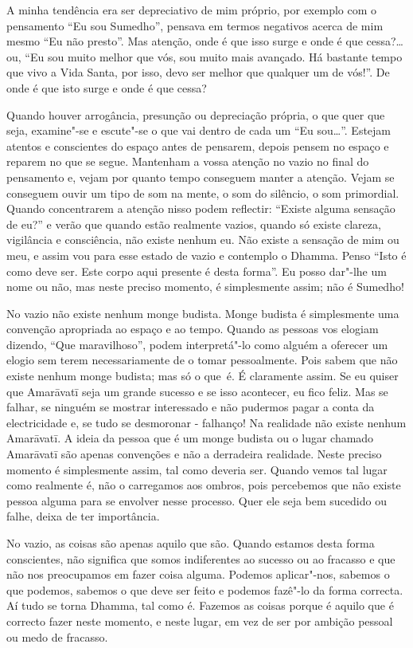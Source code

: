A minha tendência era ser depreciativo de mim próprio, por exemplo com o
pensamento “Eu sou Sumedho”, pensava em termos negativos acerca de mim mesmo “Eu
não presto”. Mas atenção, onde é que isso surge e onde é que cessa?\ldots{} ou,
“Eu sou muito melhor que vós, sou muito mais avançado. Há bastante tempo que
vivo a Vida Santa, por isso, devo ser melhor que qualquer um de vós!”. De onde é
que isto surge e onde é que cessa?

Quando houver arrogância, presunção ou depreciação própria, o que quer que seja,
examine"-se e escute"-se o que vai dentro de cada um “Eu sou\ldots{}”. Estejam
atentos e conscientes do espaço antes de pensarem, depois pensem no espaço e
reparem no que se segue. Mantenham a vossa atenção no vazio no final do
pensamento e, vejam por quanto tempo conseguem manter a atenção. Vejam se
conseguem ouvir um tipo de som na mente, o som do silêncio, o som primordial.
Quando concentrarem a atenção nisso podem reflectir: “Existe alguma sensação de
eu?” e verão que quando estão realmente vazios, quando só existe clareza,
vigilância e consciência, não existe nenhum eu. Não existe a sensação de mim ou meu, 
e assim vou para esse estado de vazio e contemplo o Dhamma. Penso “Isto é como
deve ser. Este corpo aqui presente é desta forma”. Eu posso dar"-lhe um
nome ou não, mas neste preciso momento, é simplesmente assim; não é Sumedho!

No vazio não existe nenhum monge budista. Monge budista é simplesmente uma
convenção apropriada ao espaço e ao tempo. Quando as pessoas vos elogiam
dizendo, “Que maravilhoso”, podem interpretá"-lo como alguém a oferecer um elogio
sem terem necessariamente de o tomar pessoalmente. Pois sabem que não existe
nenhum monge budista; mas só o que~é. É claramente assim. Se eu quiser que
Amarāvatī seja um grande sucesso e se isso acontecer, eu fico feliz. Mas se
falhar, se ninguém se mostrar interessado e não pudermos pagar a conta da
electricidade e, se tudo se desmoronar - falhanço! Na realidade não existe
nenhum Amarāvatī. A ideia da pessoa que é um monge budista ou o lugar chamado
Amarāvatī são apenas convenções e não a derradeira realidade. Neste preciso
momento é simplesmente assim, tal como deveria ser. Quando vemos tal lugar como
realmente é, não o carregamos aos ombros, pois percebemos que não existe pessoa
alguma para se envolver nesse processo. Quer ele seja bem sucedido ou falhe, deixa de ter importância.

No vazio, as coisas são apenas aquilo que são. Quando estamos desta forma conscientes, 
não significa que somos indiferentes ao sucesso ou ao fracasso e que
não nos preocupamos em fazer coisa alguma. Podemos aplicar"-nos, sabemos o
que podemos, sabemos o que deve ser feito e podemos fazê"-lo da forma correcta.
Aí tudo se torna Dhamma, tal como é. Fazemos as coisas porque é aquilo que é
correcto fazer neste momento, e neste lugar, em vez de ser por ambição pessoal
ou medo de fracasso.

